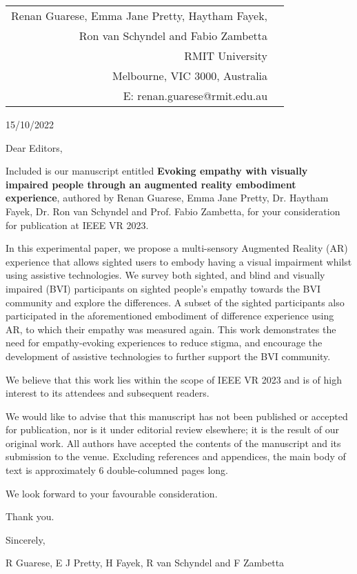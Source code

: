 \documentclass[12pt]{article}
\begin{document}
\hfill
\begin{tabular}{rr}
     Renan Guarese, Emma Jane Pretty, Haytham Fayek, \\
     Ron van Schyndel and Fabio Zambetta \\
     RMIT University \\
     Melbourne, VIC 3000, Australia \\
     E: renan.guarese@rmit.edu.au \\
 \end{tabular}
 
\vspace{12pt}

15/10/2022
\vspace{24pt}

Dear Editors,
\vspace{12pt}

Included is our manuscript entitled \textbf{Evoking empathy with visually impaired people through an augmented reality embodiment experience}, authored by Renan Guarese, Emma Jane Pretty, Dr. Haytham Fayek, Dr. Ron van Schyndel and Prof. Fabio Zambetta, for your consideration for publication at IEEE VR 2023.
\vspace{1pt}

In this experimental paper, we propose a multi-sensory Augmented Reality (AR) experience that allows sighted users to embody having a visual impairment whilst using assistive technologies. We survey both sighted, and blind and visually impaired (BVI) participants on sighted people's empathy towards the BVI community and explore the differences. A subset of the sighted participants also participated in the aforementioned embodiment of difference experience using AR, to which their empathy was measured again. This work demonstrates the need for empathy-evoking experiences to reduce stigma, and encourage the development of assistive technologies to further support the BVI community.
\vspace{12pt}

We believe that this work lies within the scope of IEEE VR 2023 and is of high interest to its attendees and subsequent readers.
\vspace{12pt}

We would like to advise that this manuscript has not been published or accepted for publication, nor is it under editorial review elsewhere; it is the result of our original work. All authors have accepted the contents of the manuscript and its submission to the venue. Excluding references and appendices, the main body of text is approximately 6 double-columned pages long.
\vspace{12pt}

We look forward to your favourable consideration.
\vspace{12pt}

Thank you.
\vspace{24pt}

Sincerely,
\vspace{12pt}

 R Guarese, E J Pretty, H Fayek, R van Schyndel and F Zambetta
\end{document}
